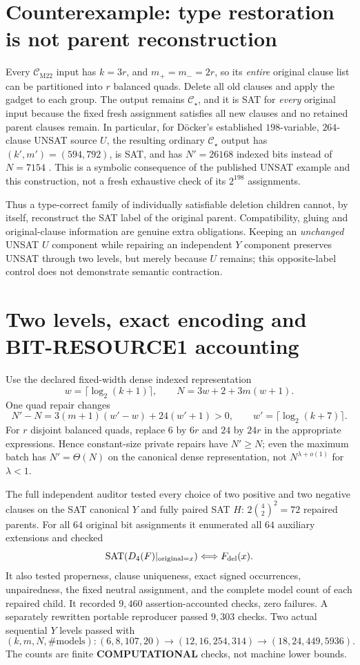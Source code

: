 \documentclass[11pt]{article}
\newcommand{\CM}{\mathcal C_{\mathrm{M22}}}
\newcommand{\CS}{\mathcal C_\star}
\begin{document}
\section{Counterexample: type restoration is not parent reconstruction}
Every \(\CM\) input has \(k=3r\), and \(m_+=m_-=2r\), so its \emph{entire} original clause list can be partitioned into \(r\) balanced quads. Delete all old clauses and apply the gadget to each group. The output remains \(\CS\), and it is SAT for \emph{every} original input because the fixed fresh assignment satisfies all new clauses and no retained parent clauses remain. In particular, for D\"ocker's established \(198\)-variable, \(264\)-clause UNSAT source \(U\), the resulting ordinary \(\CS\) output has \((k',m')=(594,792)\), is SAT, and has \(N'=26168\) indexed bits instead of \(N=7154\) \cite{docker}. This is a symbolic consequence of the published UNSAT example and this construction, not a fresh exhaustive check of its \(2^{198}\) assignments.

Thus a type-correct family of individually satisfiable deletion children cannot, by itself, reconstruct the SAT label of the original parent. Compatibility, gluing and original-clause information are genuine extra obligations. Keeping an \emph{unchanged} UNSAT \(U\) component while repairing an independent \(Y\) component preserves UNSAT through two levels, but merely because \(U\) remains; this opposite-label control does not demonstrate semantic contraction.

\section{Two levels, exact encoding and BIT-RESOURCE1 accounting}
Use the declared fixed-width dense indexed representation
\[
 w=\lceil\log_2(k+1)\rceil,\qquad
 N=3w+2+3m(w+1).
\]
One quad repair changes
\[
\boxed{
N'-N=3(m+1)(w'-w)+24(w'+1)>0,\qquad
w'=\lceil\log_2(k+7)\rceil.}\tag{6}
\]
For \(r\) disjoint balanced quads, replace \(6\) by \(6r\) and \(24\) by \(24r\) in the appropriate expressions. Hence constant-size private repairs have \(N'\ge N\); even the maximum batch has \(N'=\Theta(N)\) on the canonical dense representation, not \(N^{\lambda+o(1)}\) for \(\lambda<1\).

The full independent auditor tested every choice of two positive and two negative clauses on the SAT canonical \(Y\) and fully paired SAT \(H\): \(2\binom42^2=72\) repaired parents. For all \(64\) original bit assignments it enumerated all \(64\) auxiliary extensions and checked
\[
\operatorname{SAT}(D_4(F)|_{\text{original}=x})
\Longleftrightarrow F_{\rm del}(x).
\]
It also tested properness, clause uniqueness, exact signed occurrences, unpairedness, the fixed neutral assignment, and the complete model count of each repaired child. It recorded \(9{,}460\) assertion-accounted checks, zero failures. A separately rewritten portable reproducer passed \(9{,}303\) checks. Two actual sequential \(Y\) levels passed with
\[
 (k,m,N,\#\mathrm{models}):
 (6,8,107,20)\to(12,16,254,314)\to
 (18,24,449,5936).
\]
The counts are finite \textbf{COMPUTATIONAL} checks, not machine lower bounds.
\end{document}

